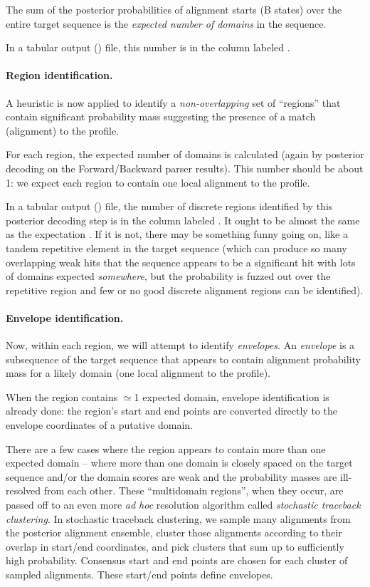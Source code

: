 The sum of the posterior probabilities of alignment starts (B states)
over the entire target sequence is the \emph{expected number of
  domains} in the sequence.

In a tabular output () file, this number is in the
column labeled .

\paragraph{Region identification.}

A heuristic is now applied to identify a \emph{non-overlapping} set of
``regions'' that contain significant probability mass suggesting the
presence of a match (alignment) to the profile.

For each region, the expected number of domains is calculated (again
by posterior decoding on the Forward/Backward parser results). This
number should be about 1: we expect each region to contain one local
alignment to the profile. 

In a tabular output () file, the number of discrete
regions identified by this posterior decoding step is in the column
labeled . It ought to be almost the same as the expectation
. If it is not, there may be something funny going on, like
a tandem repetitive element in the target sequence (which can produce
so many overlapping weak hits that the sequence appears to be a
significant hit with lots of domains expected \emph{somewhere}, but
the probability is fuzzed out over the repetitive region and few or no
good discrete alignment regions can be identified).

\paragraph{Envelope identification.}

Now, within each region, we will attempt to identify \emph{envelopes}.
An \emph{envelope} is a subsequence of the target sequence that
appears to contain alignment probability mass for a likely domain (one
local alignment to the profile).

When the region contains $\simeq$1 expected domain, envelope
identification is already done: the region's start and end points are
converted directly to the envelope coordinates of a putative domain.

There are a few cases where the region appears to contain more than
one expected domain -- where more than one domain is closely spaced on
the target sequence and/or the domain scores are weak and the
probability masses are ill-resolved from each other. These
``multidomain regions'', when they occur, are passed off to an even
more \emph{ad hoc} resolution algorithm called \emph{stochastic
  traceback clustering}. In stochastic traceback clustering, we sample
many alignments from the posterior alignment ensemble, cluster those
alignments according to their overlap in start/end coordinates, and
pick clusters that sum up to sufficiently high probability. Consensus
start and end points are chosen for each cluster of sampled
alignments. These start/end points define envelopes.

